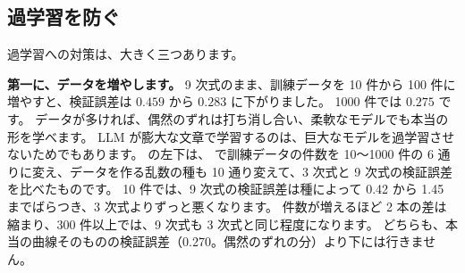 \subsection*{過学習を防ぐ}

過学習への対策は、大きく三つあります。

\textbf{第一に、データを増やします。}
9 次式のまま、訓練データを 10 件から 100 件に増やすと、検証誤差は $0.459$ から $0.283$ に下がりました。
1000 件では $0.275$ です。
データが多ければ、偶然のずれは打ち消し合い、柔軟なモデルでも本当の形を学べます。
LLM が膨大な文章で学習するのは、巨大なモデルを過学習させないためでもあります。
の左下は、 で訓練データの件数を 10〜1000 件の 6 通りに変え、データを作る乱数の種も 10 通り変えて、3 次式と 9 次式の検証誤差を比べたものです。
10 件では、9 次式の検証誤差は種によって 0.42 から 1.45 までばらつき、3 次式よりずっと悪くなります。
件数が増えるほど 2 本の差は縮まり、300 件以上では、9 次式も 3 次式と同じ程度になります。
どちらも、本当の曲線そのものの検証誤差（0.270。偶然のずれの分）より下には行きません。

